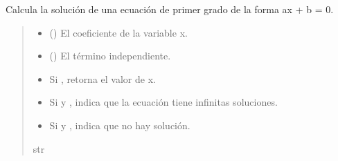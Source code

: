 \documentclass[letterpaper,10pt,spanish]{sphinxmanual}
\begin{document}
\begin{fulllineitems}
\label{\detokenize{pr3:pr3.1_3.solucion_ecuacion_primero_grado}}
\pysigstartsignatures
{}
\pysigstopsignatures
\sphinxAtStartPar
Calcula la solución de una ecuación de primer grado de la forma ax + b = 0.
\begin{quote}\begin{description}
\begin{itemize}
\item {} 
\sphinxAtStartPar
{} () \textendash{} El coeficiente de la variable x.

\item {} 
\sphinxAtStartPar
{} () \textendash{} El término independiente.

\end{itemize}

\sphinxAtStartPar
\begin{description}
\begin{itemize}
\item {} 
\sphinxAtStartPar
Si , retorna el valor de x.

\item {} 
\sphinxAtStartPar
Si  y , indica que la ecuación tiene infinitas soluciones.

\item {} 
\sphinxAtStartPar
Si  y , indica que no hay solución.

\end{itemize}

\end{description}


\sphinxAtStartPar
str

\end{description}\end{quote}

\end{fulllineitems}
\end{document}
